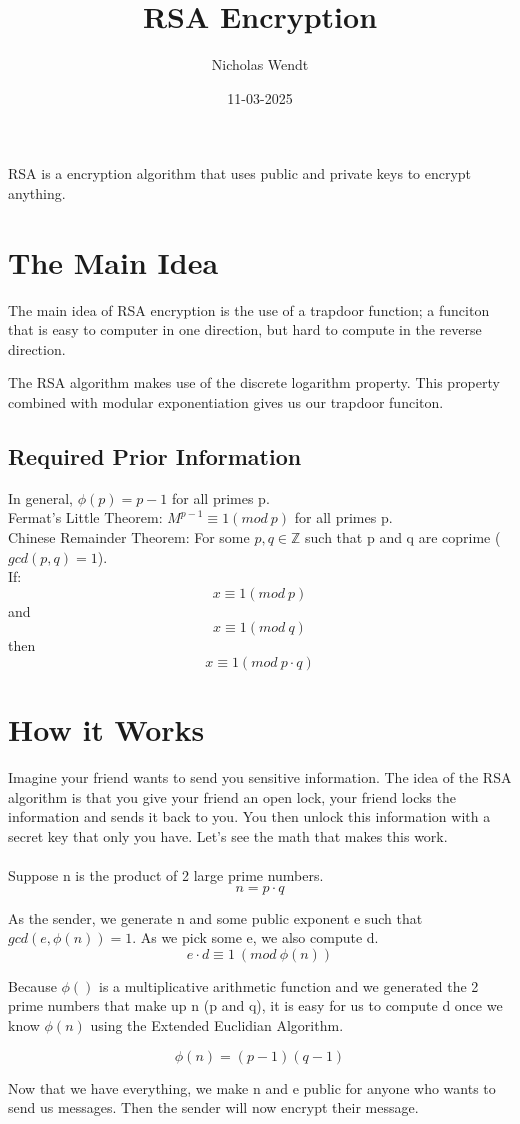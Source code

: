 \documentclass{article}
\title{RSA Encryption}
\author{Nicholas Wendt}
\date{11-03-2025}
\begin{document}
RSA is a encryption algorithm that uses public and private keys to encrypt anything.
\\ 
\section*{The Main Idea}
The main idea of RSA encryption is the use of a trapdoor function; 
a funciton that is easy to computer in one direction, but hard to compute in the reverse direction.

The RSA algorithm makes use of the discrete logarithm property. 
This property combined with modular exponentiation gives us our trapdoor funciton.


\subsection*{Required Prior Information}
In general, $\phi(p) = p-1$ for all primes p.\\
Fermat's Little Theorem: $M^{p-1} \equiv 1 (mod\ p)$ for all primes p.\\
Chinese Remainder Theorem: For some $p,q \in \mathbb{Z}$ such that p and q are coprime ($gcd(p,q)=1$).\\
If:
$$
x \equiv 1(mod\ p)
$$
and
$$
x \equiv 1(mod\ q)
$$
then
$$
x \equiv 1(mod\ p \cdot q)
$$
\section*{How it Works}
Imagine your friend wants to send you sensitive information. 
The idea of the RSA algorithm is that you give your friend an open lock, 
your friend locks the information and sends it back to you. 
You then unlock this information with a secret key that only you have. 
Let's see the math that makes this work.
\\
\\
Suppose n is the product of 2 large prime numbers.
$$
n = p\cdot q
$$

As the sender, we generate n and some public exponent e such that \mbox{$gcd(e,\phi(n)) = 1$}. 
As we pick some e, we also compute d.
$$
e \cdot d \equiv 1\ (mod\ \phi(n))
$$

Because $\phi()$ is a multiplicative arithmetic function and we generated the 2 prime numbers that make up n (p and q), 
it is easy for us to compute d once we know $\phi(n)$ using the Extended Euclidian Algorithm.

$$
\phi(n) = (p-1)(q-1)
$$ 

Now that we have everything, we make n and e public for anyone who wants to send us messages. 
Then the sender will now encrypt their message.
\end{document}
